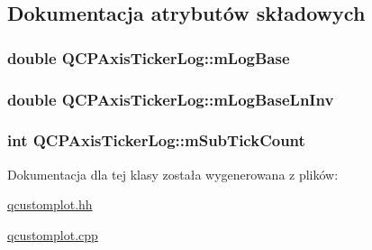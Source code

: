 \subsection{Dokumentacja atrybutów składowych}
\subsubsection[{\texorpdfstring{m\+Log\+Base}{mLogBase}}]{\setlength{\rightskip}{0pt plus 5cm}double Q\+C\+P\+Axis\+Ticker\+Log\+::m\+Log\+Base\hspace{0.3cm}{\ttfamily [protected]}}\hypertarget{class_q_c_p_axis_ticker_log_a4108bcc1cd68dcec54dc75667440d328}{}\label{class_q_c_p_axis_ticker_log_a4108bcc1cd68dcec54dc75667440d328}
\subsubsection[{\texorpdfstring{m\+Log\+Base\+Ln\+Inv}{mLogBaseLnInv}}]{\setlength{\rightskip}{0pt plus 5cm}double Q\+C\+P\+Axis\+Ticker\+Log\+::m\+Log\+Base\+Ln\+Inv\hspace{0.3cm}{\ttfamily [protected]}}\hypertarget{class_q_c_p_axis_ticker_log_aeba719bbeec39957f475ef89d6ae2fe7}{}\label{class_q_c_p_axis_ticker_log_aeba719bbeec39957f475ef89d6ae2fe7}
\subsubsection[{\texorpdfstring{m\+Sub\+Tick\+Count}{mSubTickCount}}]{\setlength{\rightskip}{0pt plus 5cm}int Q\+C\+P\+Axis\+Ticker\+Log\+::m\+Sub\+Tick\+Count\hspace{0.3cm}{\ttfamily [protected]}}\hypertarget{class_q_c_p_axis_ticker_log_a3d92b729bedbbbd34ee5f74565defd95}{}\label{class_q_c_p_axis_ticker_log_a3d92b729bedbbbd34ee5f74565defd95}


Dokumentacja dla tej klasy została wygenerowana z plików\+:\begin{DoxyCompactItemize}
\item 
\hyperlink{qcustomplot_8hh}{qcustomplot.\+hh}\item 
\hyperlink{qcustomplot_8cpp}{qcustomplot.\+cpp}\end{DoxyCompactItemize}
